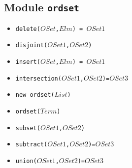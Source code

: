 \documentclass[10pt]{article}
\begin{document}
\begin{multicols}{2}
\section*{Module \texttt{ordset}}
\begin{scriptsize}
\begin{itemize}
\item \texttt{delete($OSet$,$Elm$) = $OSet1$}
\item \texttt{disjoint($OSet1$,$OSet2$)}
\item \texttt{insert($OSet$,$Elm$) = $OSet1$}
\item \texttt{intersection($OSet1$,$OSet2$)=$OSet3$}
\item \texttt{new\_ordset($List$)}
\item \texttt{ordset($Term$)}
\item \texttt{subset($OSet1$,$OSet2$)}
\item \texttt{subtract($OSet1$,$OSet2$)=$OSet3$}
\item \texttt{union($OSet1$,$OSet2$)=$OSet3$}
\end{itemize}
\end{scriptsize}

\end{multicols}
\end{document}
